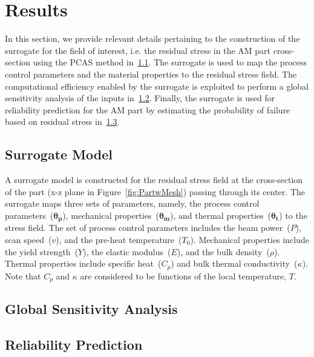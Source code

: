 \section{Results}
\label{sec:results}

In this section, we provide relevant details pertaining to the construction of the surrogate for the field of interest, i.e. the
residual stress in the AM part cross-section using the PCAS method in~\ref{sub:surr}. The surrogate is used to map
the process control parameters and the material properties to the residual stress field. The computational efficiency
enabled by the surrogate is exploited to perform a global sensitivity analysis of the inputs in~\ref{sub:gsa}. Finally, the
surrogate is used for reliability prediction for the AM part by estimating the probability of failure based on residual stress
in~\ref{sub:reliability}.

\subsection{Surrogate Model}
\label{sub:surr}

A surrogate model is constructed for the residual stress field at the cross-section of the part 
(x-z plane in Figure~\ref{fig:PartwMesh}) passing through its center. The surrogate maps three sets of
parameters, namely, the process control parameters~($\bm{\theta_p}$), mechanical properties~($\bm{\theta_m}$),
and thermal properties~($\bm{\theta_t}$) to the stress field. The set of process control parameters includes
the beam power~($P$), scan speed~($v$), and the pre-heat temperature~($T_0$). Mechanical properties
include the yield strength~($Y$), the elastic modulus~($E$), and the bulk density~($\rho$). Thermal 
properties include specific heat~($C_p$) and bulk thermal conductivity~($\kappa$). Note that $C_p$ and $\kappa$
are considered to be functions of the local temperature, $T$.






\subsection{Global Sensitivity Analysis}
\label{sub:gsa}


\subsection{Reliability Prediction}
\label{sub:reliability}




 

